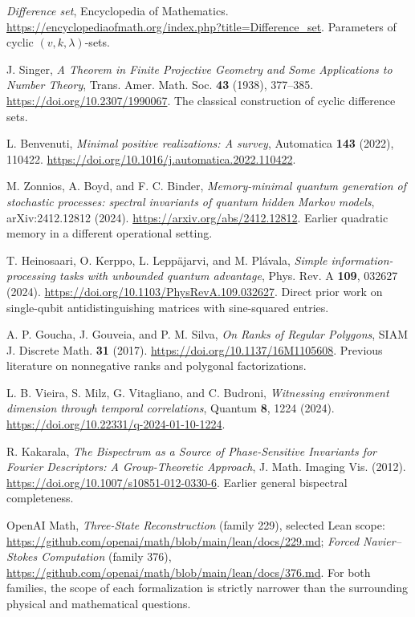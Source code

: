 \documentclass[11pt,a4paper,oneside]{book}
\begin{document}
\begin{enumerate}[label={[\arabic*]},leftmargin=*,itemsep=7pt]
\item \emph{Difference set}, Encyclopedia of Mathematics. \url{https://encyclopediaofmath.org/index.php?title=Difference_set}. Parameters of cyclic $(v,k,\lambda)$-sets.
\item J. Singer, \emph{A Theorem in Finite Projective Geometry and Some Applications to Number Theory}, Trans. Amer. Math. Soc. \textbf{43} (1938), 377--385. \url{https://doi.org/10.2307/1990067}. The classical construction of cyclic difference sets.
\item L. Benvenuti, \emph{Minimal positive realizations: A survey}, Automatica \textbf{143} (2022), 110422. \url{https://doi.org/10.1016/j.automatica.2022.110422}.
\item M. Zonnios, A. Boyd, and F. C. Binder, \emph{Memory-minimal quantum generation of stochastic processes: spectral invariants of quantum hidden Markov models}, arXiv:2412.12812 (2024). \url{https://arxiv.org/abs/2412.12812}. Earlier quadratic memory in a different operational setting.
\item T. Heinosaari, O. Kerppo, L. Lepp\"ajarvi, and M. Pl\'avala, \emph{Simple information-processing tasks with unbounded quantum advantage}, Phys. Rev. A \textbf{109}, 032627 (2024). \url{https://doi.org/10.1103/PhysRevA.109.032627}. Direct prior work on single-qubit antidistinguishing matrices with sine-squared entries.
\item A. P. Goucha, J. Gouveia, and P. M. Silva, \emph{On Ranks of Regular Polygons}, SIAM J. Discrete Math. \textbf{31} (2017). \url{https://doi.org/10.1137/16M1105608}. Previous literature on nonnegative ranks and polygonal factorizations.
\item L. B. Vieira, S. Milz, G. Vitagliano, and C. Budroni, \emph{Witnessing environment dimension through temporal correlations}, Quantum \textbf{8}, 1224 (2024). \url{https://doi.org/10.22331/q-2024-01-10-1224}.
\item R. Kakarala, \emph{The Bispectrum as a Source of Phase-Sensitive Invariants for Fourier Descriptors: A Group-Theoretic Approach}, J. Math. Imaging Vis. (2012). \url{https://doi.org/10.1007/s10851-012-0330-6}. Earlier general bispectral completeness.
\item OpenAI Math, \emph{Three-State Reconstruction} (family 229), selected Lean scope: \url{https://github.com/openai/math/blob/main/lean/docs/229.md}; \emph{Forced Navier--Stokes Computation} (family 376), \url{https://github.com/openai/math/blob/main/lean/docs/376.md}. For both families, the scope of each formalization is strictly narrower than the surrounding physical and mathematical questions.

\end{enumerate}
\end{document}
